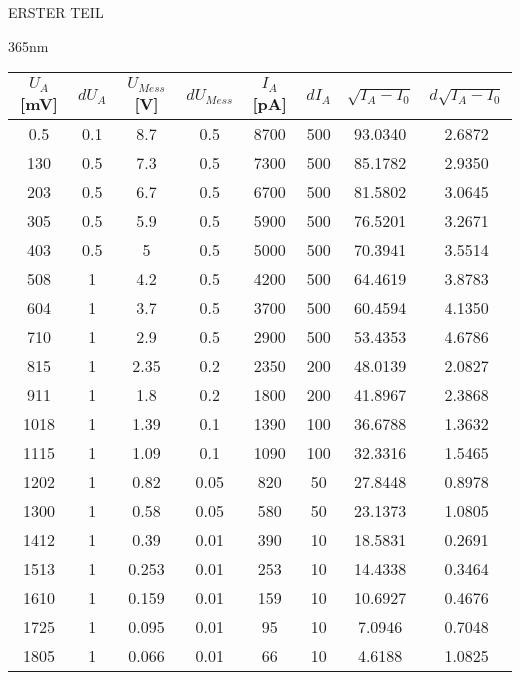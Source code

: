 \begin{appendix}
\begin{chapter}{ERSTER TEIL}
\begin{section}{365nm}
        \begin{table}[htbp]
          \centering
          \footnotesize
          \begin{tabular}{|c|c|c|c|c|c|c|c|}
            \hline
            $U_{A}$ [mV] & $dU_{A}$ & $U_{Mess}$ [V] & $dU_{Mess}$ & 
                $I_{A}$ [pA] & $dI_{A}$ & $\sqrt{I_{A}-I_0}$ & 
                $d\sqrt{I_{A}-I_0}$ \\ \hline
            0.5 & 0.1 & 8.7 & 0.5 & 8700 & 500 & 93.0340 & 2.6872 \\ \hline
            130 & 0.5 & 7.3 & 0.5 & 7300 & 500 & 85.1782 & 2.9350 \\ \hline
            203 & 0.5 & 6.7 & 0.5 & 6700 & 500 & 81.5802 & 3.0645 \\ \hline
            305 & 0.5 & 5.9 & 0.5 & 5900 & 500 & 76.5201 & 3.2671 \\ \hline
            403 & 0.5 & 5 & 0.5 & 5000 & 500 & 70.3941 & 3.5514 \\ \hline
            508 & 1 & 4.2 & 0.5 & 4200 & 500 & 64.4619 & 3.8783 \\ \hline
            604 & 1 & 3.7 & 0.5 & 3700 & 500 & 60.4594 & 4.1350 \\ \hline
            710 & 1 & 2.9 & 0.5 & 2900 & 500 & 53.4353 & 4.6786 \\ \hline
            815 & 1 & 2.35 & 0.2 & 2350 & 200 & 48.0139 & 2.0827 \\ \hline
            911 & 1 & 1.8 & 0.2 & 1800 & 200 & 41.8967 & 2.3868 \\ \hline
            1018 & 1 & 1.39 & 0.1 & 1390 & 100 & 36.6788 & 1.3632 \\ \hline
            1115 & 1 & 1.09 & 0.1 & 1090 & 100 & 32.3316 & 1.5465 \\ \hline
            1202 & 1 & 0.82 & 0.05 & 820 & 50 & 27.8448 & 0.8978 \\ \hline
            1300 & 1 & 0.58 & 0.05 & 580 & 50 & 23.1373 & 1.0805 \\ \hline
            1412 & 1 & 0.39 & 0.01 & 390 & 10 & 18.5831 & 0.2691 \\ \hline
            1513 & 1 & 0.253 & 0.01 & 253 & 10 & 14.4338 & 0.3464 \\ \hline
            1610 & 1 & 0.159 & 0.01 & 159 & 10 & 10.6927 & 0.4676 \\ \hline
            1725 & 1 & 0.095 & 0.01 & 95 & 10 & 7.0946 & 0.7048 \\ \hline
            1805 & 1 & 0.066 & 0.01 & 66 & 10 & 4.6188 & 1.0825 \\ \hline

\end{tabular}
\end{table}
\end{section}
\end{chapter}
\end{appendix}

